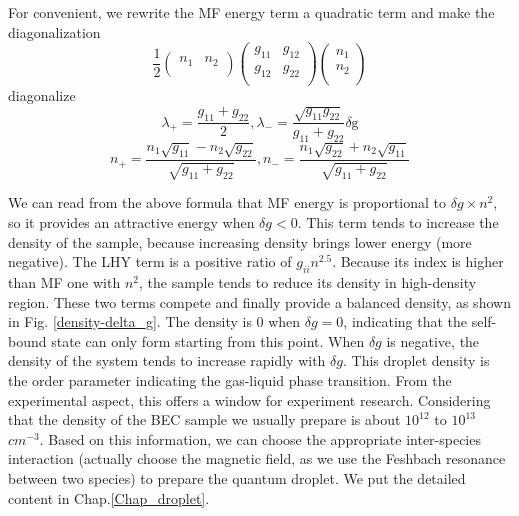 For convenient, we rewrite the MF energy term a quadratic term and make the diagonalization
\begin{equation}
\frac{1}{2}\left(
\begin{array}{cc}
 n_1 & n_2 \\
\end{array}
\right)\left(
\begin{array}{cc}
 g_{11} & g_{12} \\
 g_{12} & g_{22} \\
\end{array}
\right)\left(
\begin{array}{c}
 n_1 \\
 n_2 \\
\end{array}
\right)
\end{equation}
diagonalize
\begin{equation}
\lambda _+=\frac{g_{11}+g_{22}}{2},\lambda_-=\frac{\sqrt{g_{11}g_{22}}}{g_{11}+g_{22}}\text{$\delta $g}
\end{equation}
\begin{equation}
n_+=\frac{n_1\sqrt{g_{11}}-n_2\sqrt{g_{22}}}{\sqrt{g_{11}+g_{22}}}, n_-=\frac{n_1\sqrt{g_{22}}+n_2\sqrt{g_{11}}}{\sqrt{g_{11}+g_{22}}}
\end{equation}

We can read from the above formula that MF energy is proportional to $\delta g \times n^2$, so it provides an attractive energy when $\delta g<0$. This term tends to increase the density of the sample, because increasing density brings lower energy (more negative). The LHY term is a positive ratio of $g_{ii}n^{2.5}$. Because its index is higher than MF one with $n^2$, the sample tends to reduce its density in high-density region. These two terms compete and finally provide a balanced density, as shown in Fig. \ref{density-delta_g}. The density is 0 when $\delta g=0$, indicating that the self-bound state can only form starting from this point. When $\delta g$ is negative, the density of the system tends to increase rapidly with $\delta g$. This droplet density is the order parameter indicating the gas-liquid phase transition. From the experimental aspect, this offers a window for experiment research. Considering that the density of the BEC sample we usually prepare is about $10^{12}$ to $10^{13}$ $cm^{-3}$. Based on this information, we can choose the appropriate inter-species interaction (actually choose the magnetic field, as we use the Feshbach resonance between two species) to prepare the quantum droplet. We put the detailed content in Chap.\ref{Chap_droplet}.

